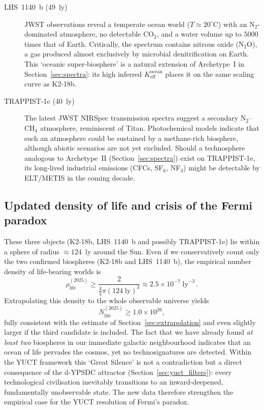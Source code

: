 \documentclass[12pt,a4paper]{article}
\begin{document}
	\begin{description}
		\item[LHS~1140~b (49~ly)] JWST observations \citep{Damiano2025} reveal a temperate ocean world ($T\approx 20^{\circ}\mathrm{C}$) with an N$_2$-dominated atmosphere, no detectable CO$_2$, and a water volume up to $5000$ times that of Earth.  Critically, the spectrum contains nitrous oxide (N$_2$O), a gas produced almost exclusively by microbial denitrification on Earth.  This `oceanic super-biosphere' is a natural extension of Archetype~I in Section~\ref{sec:spectra}: its high inferred $K_{\mathrm{eff}}^{\mathrm{ocean}}$ places it on the same scaling curve as K2-18b.
		\item[TRAPPIST-1e (40~ly)]  The latest JWST NIRSpec transmission spectra \citep{Glidden2025} suggest a secondary N$_2$--CH$_4$ atmosphere, reminiscent of Titan.  Photochemical models \citep{EagerNash2025} indicate that such an atmosphere could be sustained by a methane-rich biosphere, although abiotic scenarios are not yet excluded.  Should a technosphere analogous to Archetype~II (Section~\ref{sec:spectra}) exist on TRAPPIST-1e, its long-lived industrial emissions (CFCs, SF$_6$, NF$_3$) might be detectable by ELT/METIS in the coming decade.
	\end{description}
	
	\subsection{Updated density of life and crisis of the Fermi paradox}
	These three objects (K2-18b, LHS~1140~b and possibly TRAPPIST-1e) lie within a sphere of radius $\approx 124$~ly around the Sun.  Even if we conservatively count only the two confirmed biospheres (K2-18b and LHS~1140~b), the empirical number density of life-bearing worlds is
	\begin{equation}
		\rho_{\mathrm{life}}^{(2025)} \ge \frac{2}{\frac{4}{3}\pi (124\;\mathrm{ly})^{3}} \approx 2.5\times10^{-7}\;\mathrm{ly}^{-3}\, .
	\end{equation}
	Extrapolating this density to the whole observable universe yields
	\begin{equation}
		N_{\mathrm{life}}^{(2025)} \ge 1.0\times10^{26} ,
	\end{equation}
	fully consistent with the estimate of Section~\ref{sec:extrapolation} and even slightly larger if the third candidate is included.  The fact that we have already found \emph{at least two} biospheres in our immediate galactic neighbourhood indicates that an ocean of life pervades the cosmos, yet no technosignatures are detected.  Within the YUCT framework this `Great Silence' is not a contradiction but a direct consequence of the d-YPSDC attractor (Section~\ref{sec:yuct_filters}): every technological civilisation inevitably transitions to an inward-deepened, fundamentally unobservable state.  The new data therefore strengthen the empirical case for the YUCT resolution of Fermi's paradox.
	
\end{document}
